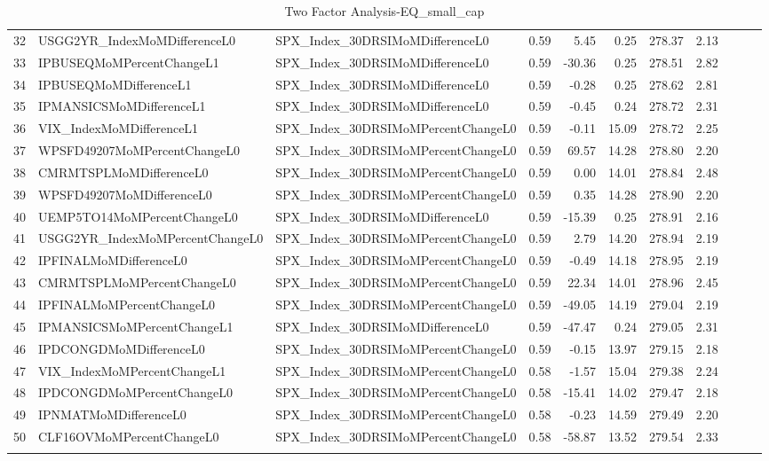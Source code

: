 \begin{longtable}{rllrrrrrlll}
  32 & USGG2YR\_IndexMoMDifferenceL0 & SPX\_Index\_30DRSIMoMDifferenceL0 & 0.59 & 5.45 & 0.25 & 278.37 & 2.13 &  &  &  \\ 
  33 & IPBUSEQMoMPercentChangeL1 & SPX\_Index\_30DRSIMoMDifferenceL0 & 0.59 & -30.36 & 0.25 & 278.51 & 2.82 &  &  &  \\ 
  34 & IPBUSEQMoMDifferenceL1 & SPX\_Index\_30DRSIMoMDifferenceL0 & 0.59 & -0.28 & 0.25 & 278.62 & 2.81 &  &  &  \\ 
  35 & IPMANSICSMoMDifferenceL1 & SPX\_Index\_30DRSIMoMDifferenceL0 & 0.59 & -0.45 & 0.24 & 278.72 & 2.31 &  &  &  \\ 
  36 & VIX\_IndexMoMDifferenceL1 & SPX\_Index\_30DRSIMoMPercentChangeL0 & 0.59 & -0.11 & 15.09 & 278.72 & 2.25 &  &  &  \\ 
  37 & WPSFD49207MoMPercentChangeL0 & SPX\_Index\_30DRSIMoMPercentChangeL0 & 0.59 & 69.57 & 14.28 & 278.80 & 2.20 &  &  &  \\ 
  38 & CMRMTSPLMoMDifferenceL0 & SPX\_Index\_30DRSIMoMPercentChangeL0 & 0.59 & 0.00 & 14.01 & 278.84 & 2.48 &  &  &  \\ 
  39 & WPSFD49207MoMDifferenceL0 & SPX\_Index\_30DRSIMoMPercentChangeL0 & 0.59 & 0.35 & 14.28 & 278.90 & 2.20 &  &  &  \\ 
  40 & UEMP5TO14MoMPercentChangeL0 & SPX\_Index\_30DRSIMoMDifferenceL0 & 0.59 & -15.39 & 0.25 & 278.91 & 2.16 &  &  &  \\ 
  41 & USGG2YR\_IndexMoMPercentChangeL0 & SPX\_Index\_30DRSIMoMPercentChangeL0 & 0.59 & 2.79 & 14.20 & 278.94 & 2.19 &  &  &  \\ 
  42 & IPFINALMoMDifferenceL0 & SPX\_Index\_30DRSIMoMPercentChangeL0 & 0.59 & -0.49 & 14.18 & 278.95 & 2.19 &  &  &  \\ 
  43 & CMRMTSPLMoMPercentChangeL0 & SPX\_Index\_30DRSIMoMPercentChangeL0 & 0.59 & 22.34 & 14.01 & 278.96 & 2.45 &  &  &  \\ 
  44 & IPFINALMoMPercentChangeL0 & SPX\_Index\_30DRSIMoMPercentChangeL0 & 0.59 & -49.05 & 14.19 & 279.04 & 2.19 &  &  &  \\ 
  45 & IPMANSICSMoMPercentChangeL1 & SPX\_Index\_30DRSIMoMDifferenceL0 & 0.59 & -47.47 & 0.24 & 279.05 & 2.31 &  &  &  \\ 
  46 & IPDCONGDMoMDifferenceL0 & SPX\_Index\_30DRSIMoMPercentChangeL0 & 0.59 & -0.15 & 13.97 & 279.15 & 2.18 &  &  &  \\ 
  47 & VIX\_IndexMoMPercentChangeL1 & SPX\_Index\_30DRSIMoMPercentChangeL0 & 0.58 & -1.57 & 15.04 & 279.38 & 2.24 &  &  &  \\ 
  48 & IPDCONGDMoMPercentChangeL0 & SPX\_Index\_30DRSIMoMPercentChangeL0 & 0.58 & -15.41 & 14.02 & 279.47 & 2.18 &  &  &  \\ 
  49 & IPNMATMoMDifferenceL0 & SPX\_Index\_30DRSIMoMPercentChangeL0 & 0.58 & -0.23 & 14.59 & 279.49 & 2.20 &  &  &  \\ 
  50 & CLF16OVMoMPercentChangeL0 & SPX\_Index\_30DRSIMoMPercentChangeL0 & 0.58 & -58.87 & 13.52 & 279.54 & 2.33 &  &  &  \\ 
   \hline
\hline
\caption{Two Factor Analysis-EQ_small_cap} 
\end{longtable}
